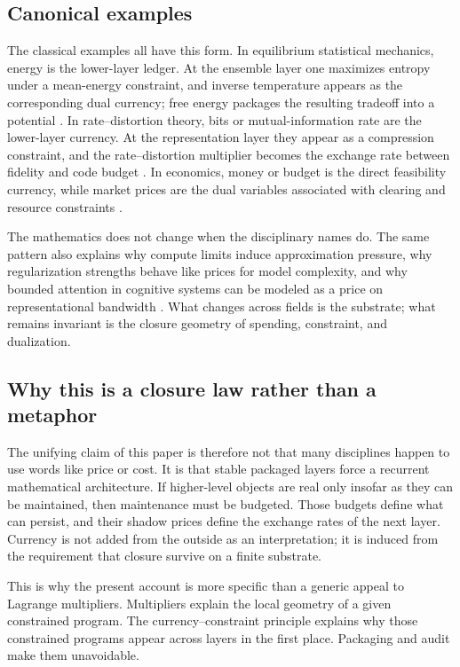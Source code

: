 \documentclass[11pt,a4paper]{article}
\begin{document}
\subsection{Canonical examples}

The classical examples all have this form. In equilibrium statistical mechanics, energy is the lower-layer ledger. At the ensemble layer one maximizes entropy under a mean-energy constraint, and inverse temperature appears as the corresponding dual currency; free energy packages the resulting tradeoff into a potential \cite{jaynes1957information,presse2013maxent}. In rate--distortion theory, bits or mutual-information rate are the lower-layer currency. At the representation layer they appear as a compression constraint, and the rate--distortion multiplier becomes the exchange rate between fidelity and code budget \cite{berger1971ratedistortion,coverthomas2006}. In economics, money or budget is the direct feasibility currency, while market prices are the dual variables associated with clearing and resource constraints \cite{arrowdebreu1954}.

The mathematics does not change when the disciplinary names do. The same pattern also explains why compute limits induce approximation pressure, why regularization strengths behave like prices for model complexity, and why bounded attention in cognitive systems can be modeled as a price on representational bandwidth \cite{sims2003rationalinattention}. What changes across fields is the substrate; what remains invariant is the closure geometry of spending, constraint, and dualization.

\subsection{Why this is a closure law rather than a metaphor}

The unifying claim of this paper is therefore not that many disciplines happen to use words like price or cost. It is that stable packaged layers force a recurrent mathematical architecture. If higher-level objects are real only insofar as they can be maintained, then maintenance must be budgeted. Those budgets define what can persist, and their shadow prices define the exchange rates of the next layer. Currency is not added from the outside as an interpretation; it is induced from the requirement that closure survive on a finite substrate.

This is why the present account is more specific than a generic appeal to Lagrange multipliers. Multipliers explain the local geometry of a given constrained program. The currency--constraint principle explains why those constrained programs appear across layers in the first place. Packaging and audit make them unavoidable.
\end{document}
